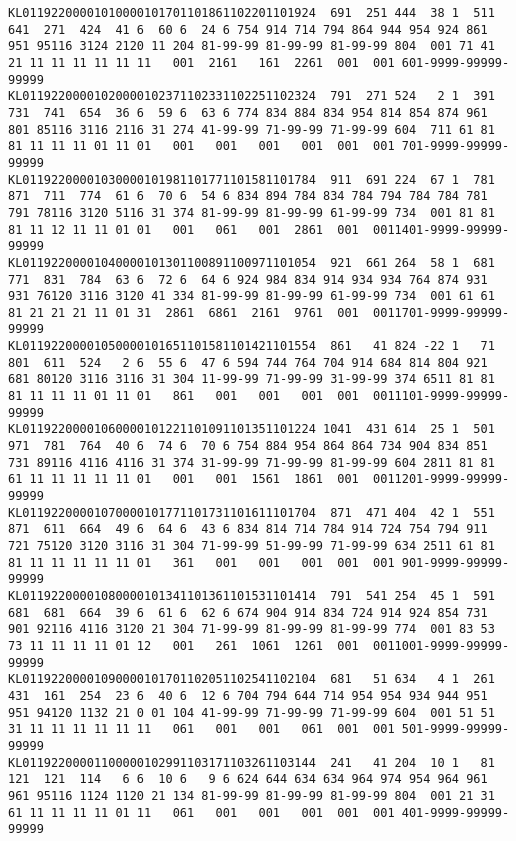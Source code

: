\documentclass{article}
\begin{document}
    \begin{Verbatim}[commandchars=\\\{\}]
KL01192200001010000101701101861102201101924  691  251 444  38 1  511  641  271  424  41 6  60 6  24 6 754 914 714 794 864 944 954 924 861 951 95116 3124 2120 11 204 81-99-99 81-99-99 81-99-99 804  001 71 41 21 11 11 11 11 11 11   001  2161   161  2261  001  001 601-9999-99999-99999
KL01192200001020000102371102331102251102324  791  271 524   2 1  391  731  741  654  36 6  59 6  63 6 774 834 884 834 954 814 854 874 961 801 85116 3116 2116 31 274 41-99-99 71-99-99 71-99-99 604  711 61 81 81 11 11 11 01 11 01   001   001   001   001  001  001 701-9999-99999-99999
KL01192200001030000101981101771101581101784  911  691 224  67 1  781  871  711  774  61 6  70 6  54 6 834 894 784 834 784 794 784 784 781 791 78116 3120 5116 31 374 81-99-99 81-99-99 61-99-99 734  001 81 81 81 11 12 11 11 01 01   001   061   001  2861  001  0011401-9999-99999-99999
KL01192200001040000101301100891100971101054  921  661 264  58 1  681  771  831  784  63 6  72 6  64 6 924 984 834 914 934 934 764 874 931 931 76120 3116 3120 41 334 81-99-99 81-99-99 61-99-99 734  001 61 61 81 21 21 21 11 01 31  2861  6861  2161  9761  001  0011701-9999-99999-99999
KL01192200001050000101651101581101421101554  861   41 824 -22 1   71  801  611  524   2 6  55 6  47 6 594 744 764 704 914 684 814 804 921 681 80120 3116 3116 31 304 11-99-99 71-99-99 31-99-99 374 6511 81 81 81 11 11 11 01 11 01   861   001   001   001  001  0011101-9999-99999-99999
KL01192200001060000101221101091101351101224 1041  431 614  25 1  501  971  781  764  40 6  74 6  70 6 754 884 954 864 864 734 904 834 851 731 89116 4116 4116 31 374 31-99-99 71-99-99 81-99-99 604 2811 81 81 61 11 11 11 11 11 01   001   001  1561  1861  001  0011201-9999-99999-99999
KL01192200001070000101771101731101611101704  871  471 404  42 1  551  871  611  664  49 6  64 6  43 6 834 814 714 784 914 724 754 794 911 721 75120 3120 3116 31 304 71-99-99 51-99-99 71-99-99 634 2511 61 81 81 11 11 11 11 11 01   361   001   001   001  001  001 901-9999-99999-99999
KL01192200001080000101341101361101531101414  791  541 254  45 1  591  681  681  664  39 6  61 6  62 6 674 904 914 834 724 914 924 854 731 901 92116 4116 3120 21 304 71-99-99 81-99-99 81-99-99 774  001 83 53 73 11 11 11 11 01 12   001   261  1061  1261  001  0011001-9999-99999-99999
KL01192200001090000101701102051102541102104  681   51 634   4 1  261  431  161  254  23 6  40 6  12 6 704 794 644 714 954 954 934 944 951 951 94120 1132 21 0 01 104 41-99-99 71-99-99 71-99-99 604  001 51 51 31 11 11 11 11 11 11   061   001   001   061  001  001 501-9999-99999-99999
KL01192200001100000102991103171103261103144  241   41 204  10 1   81  121  121  114   6 6  10 6   9 6 624 644 634 634 964 974 954 964 961 961 95116 1124 1120 21 134 81-99-99 81-99-99 81-99-99 804  001 21 31 61 11 11 11 11 01 11   061   001   001   001  001  001 401-9999-99999-99999
    \end{Verbatim}
\end{document}
